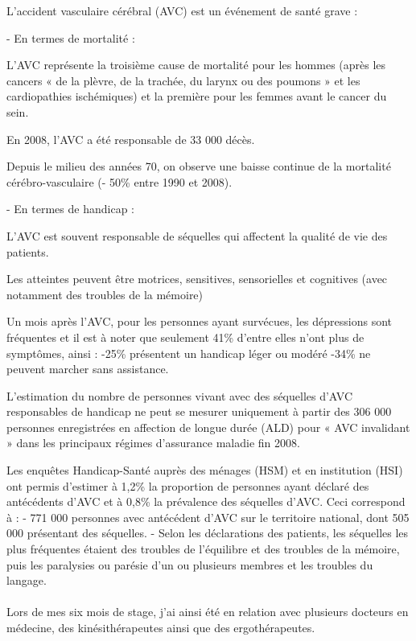 L’accident vasculaire cérébral (AVC) est un événement de santé grave :

- En termes de mortalité :

    L’AVC représente la troisième cause de mortalité pour les hommes (après les cancers « de la plèvre, de la trachée, du larynx ou des poumons » et les cardiopathies ischémiques) et la première pour les femmes avant le cancer du sein.

    En 2008, l’AVC a été responsable de 33 000 décès.

    Depuis le milieu des années 70, on observe une baisse continue de la mortalité cérébro-vasculaire (- 50\% entre 1990 et 2008).

- En termes de handicap :

    L’AVC est souvent responsable de séquelles qui affectent la qualité de vie des patients. 

    Les atteintes peuvent être motrices, sensitives, sensorielles et cognitives (avec notamment des troubles de la mémoire) 

    Un mois après l’AVC, pour les personnes ayant survécues, les dépressions sont fréquentes et il est à noter que seulement 41\% d’entre elles n’ont plus de symptômes, ainsi :
    -25\% présentent un handicap léger ou modéré
    -34\% ne peuvent marcher sans assistance.

    L’estimation du nombre de personnes vivant avec des séquelles d’AVC responsables de handicap ne peut se mesurer uniquement à partir des 306 000 personnes enregistrées en affection de longue durée (ALD) pour « AVC invalidant » dans les principaux régimes d’assurance maladie fin 2008.

    Les enquêtes Handicap-Santé auprès des ménages (HSM) et en institution (HSI) ont permis d’estimer à 1,2\% la proportion de personnes ayant déclaré des antécédents d’AVC et à 0,8\% la prévalence des séquelles d’AVC. Ceci correspond à :
    - 771 000 personnes avec antécédent d’AVC sur le territoire national, dont 505 000 présentant des séquelles.
    - Selon les déclarations des patients, les séquelles les plus fréquentes étaient des troubles de l’équilibre et des troubles de la mémoire, puis les paralysies ou parésie d’un ou plusieurs membres et les troubles du langage.
    	
\paragraph{}
Lors de mes six mois de stage, j'ai ainsi été en relation avec plusieurs docteurs en médecine, des kinésithérapeutes ainsi que des ergothérapeutes.


